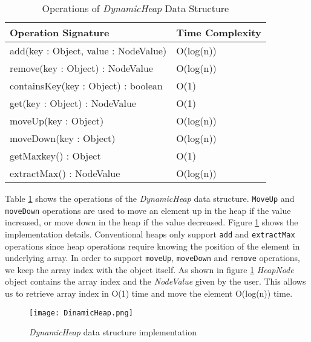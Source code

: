 \begin{table}
\centering
\caption{Operations of \textit{DynamicHeap} Data Structure}
\begin{tabular}{|l|l|} \hline
Operation Signature & Time Complexity \\ \hline \hline
add(key : Object, value : NodeValue) & O(log(n)) \\ \hline
remove(key : Object) : NodeValue & O(log(n)) \\ \hline
containsKey(key : Object) : boolean & O(1) \\ \hline
get(key : Object) : NodeValue & O(1) \\ \hline
moveUp(key : Object) & O(log(n)) \\ \hline
moveDown(key : Object) & O(log(n)) \\ \hline
getMaxkey() : Object & O(1) \\ \hline
extractMax() : NodeValue & O(log(n)) \\ \hline
\end{tabular}
\label{dynamicheap_api}
\end{table}

Table \ref{dynamicheap_api} shows the operations of the \textit{DynamicHeap} data structure. \texttt{MoveUp} and \texttt{moveDown} operations are used to move an element up in the heap if the value increased, or move down in the heap if the value decreased. Figure \ref{dynamicheap_impl} shows the implementation details. Conventional heaps only support \texttt{add} and \texttt{extractMax} operations since heap operations require knowing the position of the element in underlying array. In order to support \texttt{moveUp}, \texttt{moveDown} and \texttt{remove} operations, we keep the array index with the object itself. As shown in figure \ref{dynamicheap_impl} \textit{HeapNode} object contains the array index and the \textit{NodeValue} given by the user. This allows us to retrieve array index in O(1) time and move the element O(log(n)) time.


\begin{figure}[!t]
        \centering
        \texttt{[image: DinamicHeap.png]}
        \caption{\textit{DynamicHeap} data structure implementation}
        \label{dynamicheap_impl}
\end{figure}


